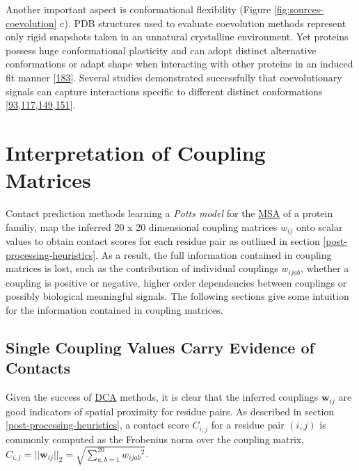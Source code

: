 \documentclass[11pt,a4paper,twoside]{book}
\newcommand{\wij}{\mathbf{w}_{ij}}
\newcommand{\wijab}{w_{ijab}}
\theoremstyle{definition}
\theoremstyle{definition}
\theoremstyle{remark}
\begin{document}
Another important aspect is conformational flexibility (Figure
\ref{fig:sources-coevolution} c). PDB structures used to evaluate
coevolution methods represent only rigid snapshots taken in an unnatural
crystalline environment. Yet proteins possess huge conformational
plasticity and can adopt distinct alternative conformations or adapt
shape when interacting with other proteins in an induced fit manner
{[}\protect\hyperlink{ref-Noel2016}{183}{]}. Several studies
demonstrated successfully that coevolutionary signals can capture
interactions specific to different distinct conformations
{[}\protect\hyperlink{ref-Morcos2011}{93},\protect\hyperlink{ref-Hopf2012}{117},\protect\hyperlink{ref-Sfriso2016}{149},\protect\hyperlink{ref-Jana2014}{151}{]}.

\chapter{Interpretation of Coupling
Matrices}\label{interpreting-coupling-matrices}

Contact prediction methods learning a \emph{Potts model} for the
\protect\hyperlink{abbrev}{MSA} of a protein familiy, map the inferred
20 x 20 dimensional coupling matrices \(w_{ij}\) onto scalar values to
obtain contact scores for each residue pair as outlined in section
\ref{post-processing-heuristics}. As a result, the full information
contained in coupling matrices is lost, such as the contribution of
individual couplings \(\wijab\), whether a coupling is positive or
negative, higher order dependencies between couplings or possibly
biological meaningful signals. The following sections give some
intuition for the information contained in coupling matrices.

\section{Single Coupling Values Carry Evidence of
Contacts}\label{correlation-between-couplings-and-class}

Given the success of \protect\hyperlink{abbrev}{DCA} methods, it is
clear that the inferred couplings \(\wij\) are good indicators of
spatial proximity for residue pairs. As described in section
\ref{post-processing-heuristics}, a contact score \(C_{i,j}\) for a
residue pair \((i,j)\) is commonly computed as the Frobenius norm over
the coupling matrix,
\(C_{i,j}=||\wij||_2 = \sqrt{\sum_{a,b=1}^{20} {\wijab}^2}\).
\end{document}
